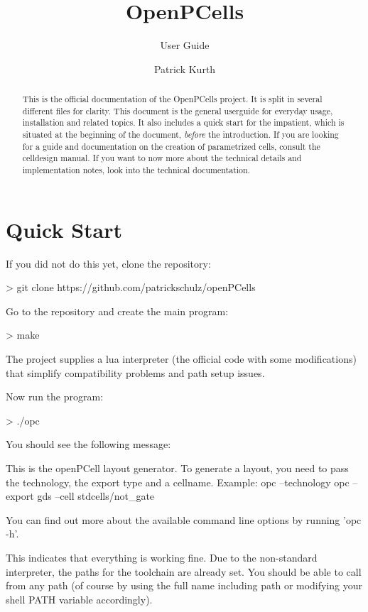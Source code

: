 

\title{OpenPCells}
\subtitle{User Guide}
\author{Patrick Kurth}



\maketitle
\begin{abstract}
    \noindent This is the official documentation of the OpenPCells project.
    It is split in several different files for clarity. 
    This document is the general userguide for everyday usage, installation and related topics.
    It also includes a quick start for the impatient, which is situated at the beginning of the document, \emph{before} the introduction.
    If you are looking for a guide and documentation on the creation of parametrized cells, consult the celldesign manual.
    If you want to now more about the technical details and implementation notes, look into the technical documentation.
\end{abstract}

\tableofcontents

\section{Quick Start}
If you did not do this yet, clone the repository:
\begin{shellcode}
    > git clone https://github.com/patrickschulz/openPCells
\end{shellcode}
Go to the repository and create the main program:
\begin{shellcode}
    > make
\end{shellcode}
The project supplies a lua interpreter (the official code with some modifications) that simplify compatibility problems and path setup issues.

Now run the program:
\begin{shellcode}
    > ./opc
\end{shellcode}
You should see the following message:
\begin{shellcode}
    This is the openPCell layout generator.
    To generate a layout, you need to pass the technology, the export type and a cellname.
    Example:
             opc --technology opc --export gds --cell stdcells/not_gate

    You can find out more about the available command line options by running 'opc -h'.
\end{shellcode}
This indicates that everything is working fine. Due to the non-standard interpreter, the paths for the toolchain are already set. You should be able to call
 from any path (of course by using the full name including path or modifying your shell PATH variable accordingly).

